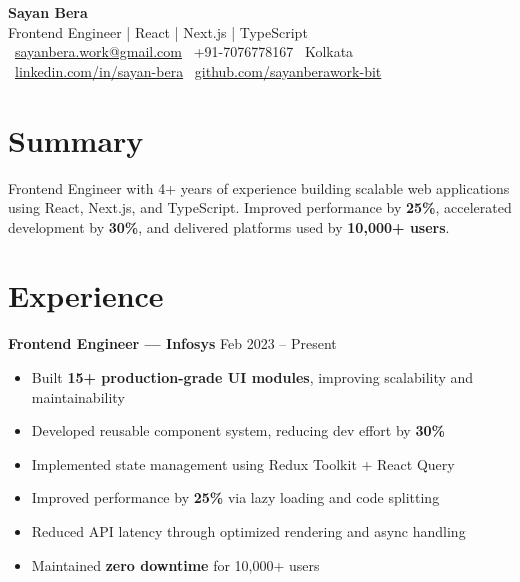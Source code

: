 \documentclass[a4paper,10pt]{article}
\begin{document}
\begin{center}
    {\Large \textbf{\color{primary}Sayan Bera}} \\
    {\small Frontend Engineer | React | Next.js | TypeScript} \\[4pt]

    \faEnvelope \ \href{mailto:sayanbera.work@gmail.com}{sayanbera.work@gmail.com} \quad
    \faPhone \ +91-7076778167 \quad
    \faMapMarker* \ Kolkata \\

    \faLinkedin \ \href{https://www.linkedin.com/in/sayan-bera-a3b88b1b3}{linkedin.com/in/sayan-bera} \quad
    \faGithub \ \href{https://github.com/sayanberawork-bit}{github.com/sayanberawork-bit}
\end{center}

\vspace{-4pt}

\section*{Summary}
Frontend Engineer with 4+ years of experience building scalable web applications using React, Next.js, and TypeScript. Improved performance by \textbf{25\%}, accelerated development by \textbf{30\%}, and delivered platforms used by \textbf{10,000+ users}.

\vspace{-6pt}

\section*{Experience}

\textbf{Frontend Engineer — Infosys} \hfill {\small Feb 2023 -- Present}
\begin{itemize}
    \item Built \textbf{15+ production-grade UI modules}, improving scalability and maintainability
    \item Developed reusable component system, reducing dev effort by \textbf{30\%}
    \item Implemented state management using Redux Toolkit + React Query
    \item Improved performance by \textbf{25\%} via lazy loading and code splitting
    \item Reduced API latency through optimized rendering and async handling
    \item Maintained \textbf{zero downtime} for 10,000+ users
\end{itemize}
\end{document}
